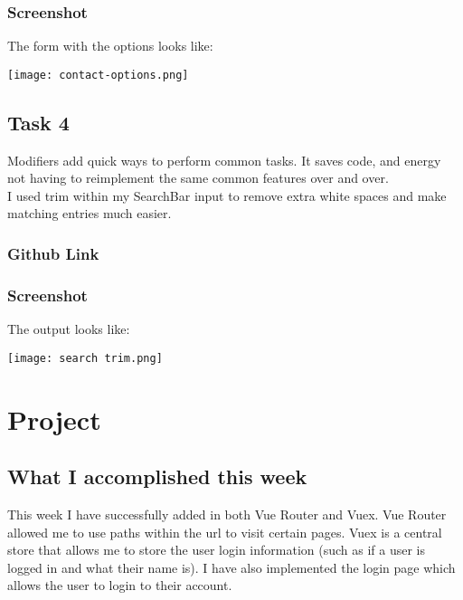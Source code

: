\documentclass[portfolio.tex]{subfiles}
\begin{document}
			\subsubsection{Screenshot}
			The form with the options looks like:

			\begin{center}
				\texttt{[image: contact-options.png]}
			\end{center}

		\subsection{Task 4}
			Modifiers add quick ways to perform common tasks. It saves code, and energy not having to reimplement the same common features over and over.\\

			I used trim within my SearchBar input to remove extra white spaces and make matching entries much easier.

			\subsubsection{Github Link}

			\subsubsection{Screenshot}
				The output looks like:

				\begin{center}
					\texttt{[image: search trim.png]}
				\end{center}


	\section{Project}
	\subsection{What I accomplished this week}
	 	This week I have successfully added in both Vue Router and Vuex. Vue Router allowed me to use paths within the url to visit certain pages. Vuex is a central store that allows me to store the user login information (such as if a user is logged in and what their name is). I have also implemented the login page which allows the user to login to their account.\\
\end{document}
